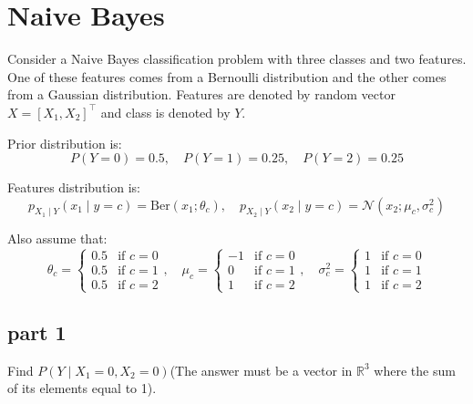 \section{Naive Bayes}

Consider a Naive Bayes classification problem with three classes and two features. One of these features comes from a Bernoulli distribution and the other comes from a Gaussian distribution. Features are denoted by random vector $X = [X_1, X_2]^\top$ and class is denoted by $Y$. 

Prior distribution is:
\[
P(Y = 0) = 0.5, \quad P(Y = 1) = 0.25, \quad P(Y = 2) = 0.25
\]

Features distribution is:
\[
p_{X_1 \mid Y}(x_1 \mid y = c) = \text{Ber}(x_1; \theta_c), \quad p_{X_2 \mid Y}(x_2 \mid y = c) = \mathcal{N}(x_2; \mu_c, \sigma_c^2)
\]

Also assume that:
\[
\theta_c = \begin{cases} 
0.5 & \text{if } c = 0 \\
0.5 & \text{if } c = 1 \\
0.5 & \text{if } c = 2 
\end{cases}, \quad
\mu_c = \begin{cases} 
-1 & \text{if } c = 0 \\
0 & \text{if } c = 1 \\
1 & \text{if } c = 2 
\end{cases}, \quad
\sigma_c^2 = \begin{cases} 
1 & \text{if } c = 0 \\
1 & \text{if } c = 1 \\
1 & \text{if } c = 2 
\end{cases}
\]

\subsection{part 1}
Find $P(Y \mid X_1 = 0, X_2 = 0)$(The answer must be a vector in $\mathbb{R}^3$ where the sum of its elements equal to 1).

